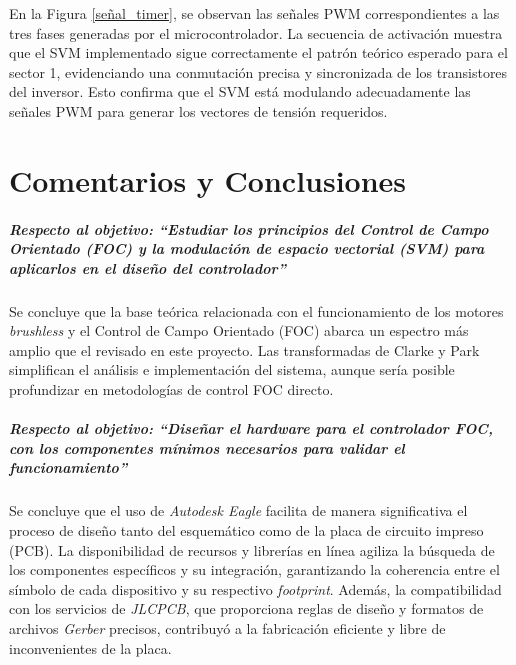 \documentclass[11pt]{report}
\begin{document}
En la Figura \ref{señal_timer}, se observan las señales PWM correspondientes a las tres fases generadas por el microcontrolador. La secuencia de activación muestra que el SVM implementado sigue correctamente el patrón teórico esperado para el sector 1, evidenciando una conmutación precisa y sincronizada de los transistores del inversor. Esto confirma que el SVM está modulando adecuadamente las señales PWM para generar los vectores de tensión requeridos.

\newpage
\chapter*{Comentarios y Conclusiones}

\paragraph{Respecto al objetivo: ``Estudiar los principios del Control de Campo Orientado (FOC) y la modulación de espacio vectorial (SVM) para aplicarlos en el diseño del controlador''} Se concluye que la base teórica relacionada con el funcionamiento de los motores \textit{brushless} y el Control de Campo Orientado (FOC) abarca un espectro más amplio que el revisado en este proyecto. Las transformadas de Clarke y Park simplifican el análisis e implementación del sistema, aunque sería posible profundizar en metodologías de control FOC directo.

\paragraph{Respecto al objetivo: ``Diseñar el hardware para el controlador FOC, con los componentes mínimos necesarios para validar el funcionamiento''} Se concluye que el uso de \emph{Autodesk Eagle} facilita de manera significativa el proceso de diseño tanto del esquemático como de la placa de circuito impreso (PCB). La disponibilidad de recursos y librerías en línea agiliza la búsqueda de los componentes específicos y su integración, garantizando la coherencia entre el símbolo de cada dispositivo y su respectivo \emph{footprint}. Además, la compatibilidad con los servicios de \emph{JLCPCB}, que proporciona reglas de diseño y formatos de archivos \emph{Gerber} precisos, contribuyó a la fabricación eficiente y libre de inconvenientes de la placa.
\end{document}
